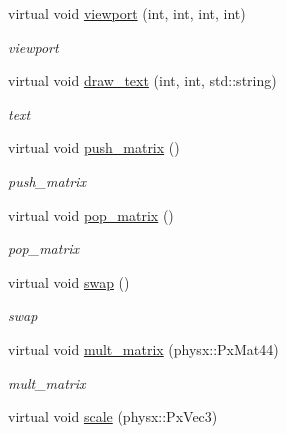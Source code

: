 \begin{DoxyCompactItemize}
virtual void \hyperlink{classnebula_1_1platform_1_1renderer_1_1gl_1_1glx_1_1base_a16cad9a3b8bb4ef8fc1e0c13652e0c2d}{viewport} (int, int, int, int)
\begin{DoxyCompactList}\small\item\em viewport \item\end{DoxyCompactList}\item 
virtual void \hyperlink{classnebula_1_1platform_1_1renderer_1_1gl_1_1glx_1_1base_a3bed53ee587076a42419e5323ffd4b13}{draw\_\-text} (int, int, std::string)
\begin{DoxyCompactList}\small\item\em text \item\end{DoxyCompactList}\item 
virtual void \hyperlink{classnebula_1_1platform_1_1renderer_1_1gl_1_1glx_1_1base_a2bf526a5a2f23318008cd1fa40a68d52}{push\_\-matrix} ()
\begin{DoxyCompactList}\small\item\em push\_\-matrix \item\end{DoxyCompactList}\item 
virtual void \hyperlink{classnebula_1_1platform_1_1renderer_1_1gl_1_1glx_1_1base_aa01b481132d930627aecfa43080c1527}{pop\_\-matrix} ()
\begin{DoxyCompactList}\small\item\em pop\_\-matrix \item\end{DoxyCompactList}\item 
virtual void \hyperlink{classnebula_1_1platform_1_1renderer_1_1gl_1_1glx_1_1base_ae401e12e3f15975e9cf09723b3617341}{swap} ()
\begin{DoxyCompactList}\small\item\em swap \item\end{DoxyCompactList}\item 
virtual void \hyperlink{classnebula_1_1platform_1_1renderer_1_1gl_1_1glx_1_1base_a3909d992dcbe8ef8af6e221633146c39}{mult\_\-matrix} (physx::PxMat44)
\begin{DoxyCompactList}\small\item\em mult\_\-matrix \item\end{DoxyCompactList}\item 
virtual void \hyperlink{classnebula_1_1platform_1_1renderer_1_1gl_1_1glx_1_1base_a2d51799c14c9f17a8e5eb0900a02714d}{scale} (physx::PxVec3)

\end{DoxyCompactItemize}
